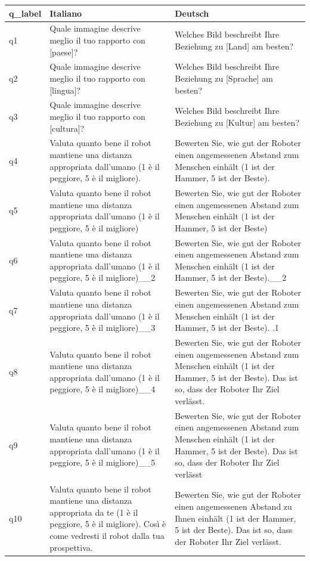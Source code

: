 \begin{table}[ht]
\centering
\begin{tabular}{lll}
\toprule
q_label & Italiano & Deutsch \\
\midrule
q1 & Quale immagine descrive meglio il tuo rapporto con [paese]? & Welches Bild beschreibt Ihre Beziehung zu [Land] am besten? \\
q2 & Quale immagine descrive meglio il tuo rapporto con [lingua]? & Welches Bild beschreibt Ihre Beziehung zu [Sprache] am besten? \\
q3 & Quale immagine descrive meglio il tuo rapporto con [cultura]? & Welches Bild beschreibt Ihre Beziehung zu [Kultur] am besten? \\
q4 & Valuta quanto bene il robot mantiene una distanza appropriata dall'umano  (1 è il peggiore, 5 è il migliore). & Bewerten Sie, wie gut der Roboter einen angemessenen Abstand zum Menschen einhält (1 ist der Hammer, 5 ist der Beste). \\
q5 & Valuta quanto bene il robot mantiene una distanza appropriata dall'umano  (1 è il peggiore, 5 è il migliore) & Bewerten Sie, wie gut der Roboter einen angemessenen Abstand zum Menschen einhält (1 ist der Hammer, 5 ist der Beste) \\
q6 & Valuta quanto bene il robot mantiene una distanza appropriata dall'umano  (1 è il peggiore, 5 è il migliore)__2 & Bewerten Sie, wie gut der Roboter einen angemessenen Abstand zum Menschen einhält (1 ist der Hammer, 5 ist der Beste).__2 \\
q7 & Valuta quanto bene il robot mantiene una distanza appropriata dall'umano  (1 è il peggiore, 5 è il migliore)__3 & Bewerten Sie, wie gut der Roboter einen angemessenen Abstand zum Menschen einhält (1 ist der Hammer, 5 ist der Beste). .1 \\
q8 & Valuta quanto bene il robot mantiene una distanza appropriata dall'umano  (1 è il peggiore, 5 è il migliore)__4 & Bewerten Sie, wie gut der Roboter einen angemessenen Abstand zum Menschen einhält (1 ist der Hammer, 5 ist der Beste). Das ist so, dass der Roboter Ihr Ziel verlässt. \\
q9 & Valuta quanto bene il robot mantiene una distanza appropriata dall'umano  (1 è il peggiore, 5 è il migliore)__5 & Bewerten Sie, wie gut der Roboter einen angemessenen Abstand zum Menschen einhält (1 ist der Hammer, 5 ist der Beste). Das ist so, dass der Roboter Ihr Ziel verlässt \\
q10 & Valuta quanto bene il robot mantiene una distanza appropriata da te  (1 è il peggiore, 5 è il migliore). Così è come vedresti il robot dalla tua prospettiva. & Bewerten Sie, wie gut der Roboter einen angemessenen Abstand zu Ihnen einhält (1 ist der Hammer, 5 ist der Beste). Das ist so, dass der Roboter Ihr Ziel verlässt. \\

\end{tabular}
\end{table}
